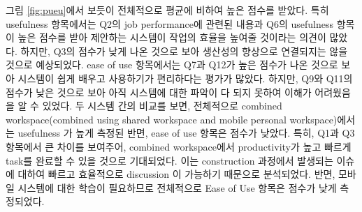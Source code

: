 그림 \ref{fig:pueu}에서 보듯이 전체적으로 평균에 비하여 높은 점수를 받았다. 특히 usefulness 항목에서는 Q2의 job performance에 관련된 내용과 Q6의 usefulness 항목이 높은 점수를 받아 제안하는 시스템이 작업의 효율을 높여줄 것이라는 의견이 많았다. 하지만, Q3의 점수가 낮게 나온 것으로 보아 생산성의 향상으로 연결되지는 않을 것으로 예상되었다. ease of use 항목에서는 Q7과 Q12가 높은 점수가 나온 것으로 보아 시스템이 쉽게 배우고 사용하기가 편리하다는 평가가 많았다. 하지만, Q9와 Q11의 점수가 낮은 것으로 보아 아직 시스템에 대한 파악이 다 되지 못하여 이해가 어려웠음을 알 수 있었다.
두 시스템 간의 비교를 보면, 전체적으로 combined workspace(combined using shared workspace and mobile personal workspace)에서는 usefulness 가 높게 측정된 반면, ease of use 항목은 점수가 낮았다. 특히, Q1과 Q3 항목에서 큰 차이를 보여주어, combined workspace에서 productivity가 높고 빠르게 task를 완료할 수 있을 것으로 기대되었다. 이는 construction 과정에서 발생되는 이슈에 대하여 빠르고 효율적으로 discussion 이 가능하기 때문으로 분석되었다. 반면, 모바일 시스템에 대한 학습이 필요하므로 전체적으로 Ease of Use 항목은 점수가 낮게 측정되었다.




